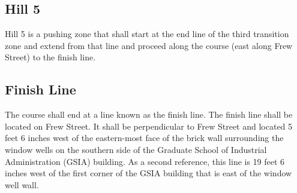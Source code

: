 \subsection{Hill 5}

	Hill 5 is a pushing zone that shall start at the end line of the third transition zone and extend from that line and proceed along the course (east along Frew Street) to the finish line.

\subsection{Finish Line}

	The course shall end at a line known as the finish line. The finish line shall be located on Frew Street. It shall be perpendicular to Frew Street and located 5 feet 6 inches west of the eastern-most face of the brick wall surrounding the window wells on the southern side of the Graduate School of Industrial Administration (GSIA) building. As a second reference, this line is 19 feet 6 inches west of the first corner of the GSIA building that is east of the window well wall.

